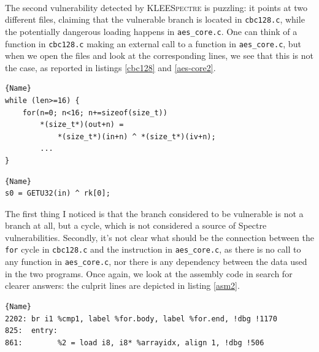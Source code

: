 \documentclass[12pt,a4paper]{book}
\theoremstyle{definition}
\begin{document}
	\paragraph{}The second vulnerability detected by \textsc{KLEESpectre} is puzzling: it points at two different files, claiming that the vulnerable branch is located in \texttt{cbc128.c}, while the potentially dangerous loading happens in \texttt{aes\_core.c}. One can think of a function in \texttt{cbc128.c} making an external call to a function in \texttt{aes\_core.c}, but when we open the files and look at the corresponding lines, we see that this is not the case, as reported in listings \ref{cbc128} and \ref{aes-core2}.
	
	\lstset{
		numbers=left
	}
	\begin{minipage}{.7\textwidth}
		\begin{lstlisting}[caption=\texttt{cbc128.c}, firstnumber=92, label=cbc128]{Name}
while (len>=16) {
	for(n=0; n<16; n+=sizeof(size_t))
		*(size_t*)(out+n) = 
			*(size_t*)(in+n) ^ *(size_t*)(iv+n);
		...
}
		\end{lstlisting}
	\end{minipage}

	\begin{minipage}{.5\textwidth}
		\begin{lstlisting}[caption=\texttt{aes\_core.c}, firstnumber=797, label=aes-core2]{Name}
s0 = GETU32(in) ^ rk[0];
		\end{lstlisting}
	\end{minipage}
	\vspace{3mm}

	The first thing I noticed is that the branch considered to be vulnerable is not a branch at all, but a cycle, which is not considered a source of Spectre vulnerabilities. Secondly, it's not clear what should be the connection between the \texttt{for} cycle in \texttt{cbc128.c} and the instruction in \texttt{aes\_core.c}, as there is no call to any function in \texttt{aes\_core.c}, nor there is any dependency between the data used in the two programs. Once again, we look at the assembly code in search for clearer answers: the culprit lines are depicted in listing \ref{asm2}.
	
	\lstset{
		numbers=none
	}
	\begin{minipage}{.9\textwidth}
	\begin{lstlisting}[caption=\texttt{assembly.ll} (for AES-CBC), label=asm2]{Name}
2202: br i1 %cmp1, label %for.body, label %for.end, !dbg !1170
825:  entry:  
861:  		%2 = load i8, i8* %arrayidx, align 1, !dbg !506

	\end{lstlisting}
	\end{minipage}
	\vspace{3mm}
\end{document}

